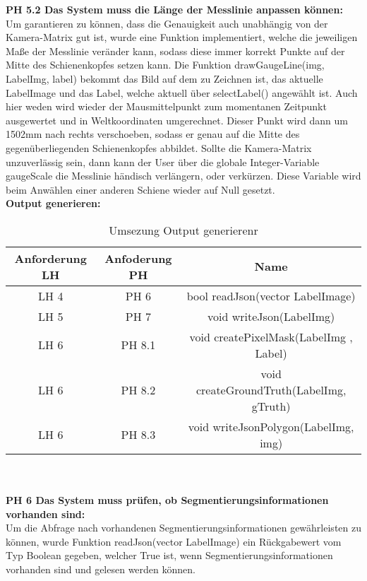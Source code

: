 \noindent
\textbf {PH 5.2 Das System muss die Länge der Messlinie anpassen können:}
\\

\noindent
Um garantieren zu können, dass die Genauigkeit auch unabhängig von der Kamera-Matrix gut ist, wurde eine Funktion implementiert, welche die jeweiligen Maße der Messlinie veränder kann, sodass diese immer korrekt Punkte auf der Mitte des Schienenkopfes setzen kann. Die Funktion drawGaugeLine(img, LabelImg, label) bekommt das Bild auf dem zu Zeichnen ist, das aktuelle LabelImage und das Label, welche aktuell über selectLabel() angewählt ist. Auch hier weden wird wieder der Mausmittelpunkt zum momentanen Zeitpunkt ausgewertet und in Weltkoordinaten umgerechnet. Dieser Punkt wird dann um 1502mm nach rechts verschoeben, sodass er genau auf die Mitte des gegenüberliegenden Schienenkopfes abbildet. Sollte die Kamera-Matrix unzuverlässig sein, dann kann der User über die globale Integer-Variable gaugeScale die Messlinie händisch verlängern, oder verkürzen. Diese Variable wird beim Anwählen einer anderen Schiene wieder auf Null gesetzt.
\\

\noindent
\textbf{Output generieren:}
\\

\noindent
\begin{table}[h]
\scriptsize
\begin{tabular}[h]{c|c|c}
Anforderung LH & Anfoderung PH & Name \\
\hline
 LH 4& PH 6 & bool readJson(vector LabelImage)\\
LH 5 & PH 7 & void writeJson(LabelImg)\\
LH 6 & PH 8.1 & void createPixelMask(LabelImg , Label)\\
LH 6 & PH 8.2 & void createGroundTruth(LabelImg, gTruth)\\
LH 6 & PH 8.3 & void writeJsonPolygon(LabelImg, img)\\
\end{tabular}
\caption{Umsezung Output generierenr}
\end{table}
\\
\\

\noindent
\textbf{PH 6  Das System muss prüfen, ob Segmentierungsinformationen vorhanden sind:}
\\

\noindent
Um die Abfrage nach vorhandenen Segmentierungsinformationen gewährleisten zu können, wurde Funktion readJson(vector LabelImage) ein Rückgabewert vom Typ Boolean gegeben, welcher True ist, wenn Segmentierungsinformationen vorhanden sind und gelesen werden können.
\\

